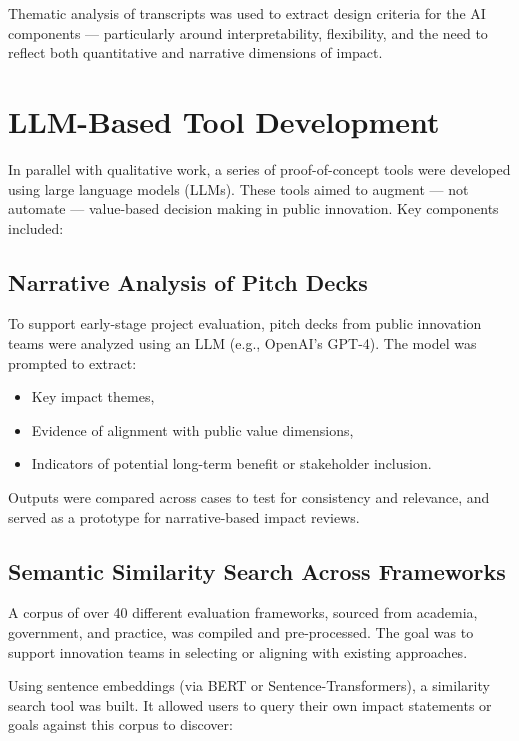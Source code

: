 Thematic analysis of transcripts was used to extract design criteria for the AI components — particularly around interpretability, flexibility, and the need to reflect both quantitative and narrative dimensions of impact.

\section{LLM-Based Tool Development}\label{sec:llm-based-tool-development}

In parallel with qualitative work, a series of proof-of-concept tools were developed using large language models (LLMs).
These tools aimed to augment — not automate — value-based decision making in public innovation.
Key components included:

\subsection{Narrative Analysis of Pitch Decks}\label{subsec:narrative-analysis-of-pitch-decks}

To support early-stage project evaluation, pitch decks from public innovation teams were analyzed using an LLM (e.g., OpenAI’s GPT-4).
The model was prompted to extract:

\begin{itemize}
    \item Key impact themes,
    \item Evidence of alignment with public value dimensions,
    \item Indicators of potential long-term benefit or stakeholder inclusion.
\end{itemize}

Outputs were compared across cases to test for consistency and relevance, and served as a prototype for narrative-based impact reviews.

\subsection{Semantic Similarity Search Across Frameworks}\label{subsec:semantic-similarity-search-across-frameworks}

A corpus of over 40 different evaluation frameworks, sourced from academia, government, and practice, was compiled and pre-processed.
The goal was to support innovation teams in selecting or aligning with existing approaches.

Using sentence embeddings (via BERT or Sentence-Transformers), a similarity search tool was built.
It allowed users to query their own impact statements or goals against this corpus to discover:

